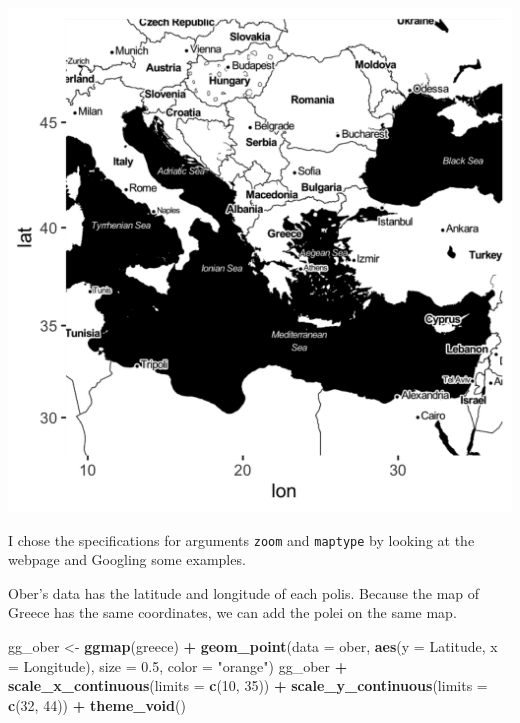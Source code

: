 \documentclass[
]{book}
\newenvironment{Shaded}{\begin{snugshade}}{\end{snugshade}}
\newcommand{\DataTypeTok}[1]{\textcolor[rgb]{0.13,0.29,0.53}{#1}}
\newcommand{\DecValTok}[1]{\textcolor[rgb]{0.00,0.00,0.81}{#1}}
\newcommand{\FloatTok}[1]{\textcolor[rgb]{0.00,0.00,0.81}{#1}}
\newcommand{\KeywordTok}[1]{\textcolor[rgb]{0.13,0.29,0.53}{\textbf{#1}}}
\newcommand{\NormalTok}[1]{#1}
\newcommand{\OperatorTok}[1]{\textcolor[rgb]{0.81,0.36,0.00}{\textbf{#1}}}
\newcommand{\StringTok}[1]{\textcolor[rgb]{0.31,0.60,0.02}{#1}}
\theoremstyle{definition}
\theoremstyle{definition}
\theoremstyle{definition}
\theoremstyle{remark}
\begin{document}
\includegraphics{images/ober_ggmap_default.png}

I chose the specifications for arguments \texttt{zoom} and \texttt{maptype} by looking at the webpage and Googling some examples.

Ober's data has the latitude and longitude of each polis. Because the map of Greece has the same coordinates, we can add the polei on the same map.

\begin{Shaded}
\begin{Highlighting}[]
\NormalTok{gg\_ober <{-}}\StringTok{ }\KeywordTok{ggmap}\NormalTok{(greece) }\OperatorTok{+}
\StringTok{  }\KeywordTok{geom\_point}\NormalTok{(}\DataTypeTok{data =}\NormalTok{ ober, }
             \KeywordTok{aes}\NormalTok{(}\DataTypeTok{y =}\NormalTok{ Latitude, }\DataTypeTok{x =}\NormalTok{ Longitude), }
             \DataTypeTok{size =} \FloatTok{0.5}\NormalTok{,}
             \DataTypeTok{color =} \StringTok{"orange"}\NormalTok{)}
\NormalTok{gg\_ober }\OperatorTok{+}\StringTok{ }
\StringTok{  }\KeywordTok{scale\_x\_continuous}\NormalTok{(}\DataTypeTok{limits =} \KeywordTok{c}\NormalTok{(}\DecValTok{10}\NormalTok{, }\DecValTok{35}\NormalTok{)) }\OperatorTok{+}\StringTok{ }
\StringTok{  }\KeywordTok{scale\_y\_continuous}\NormalTok{(}\DataTypeTok{limits =} \KeywordTok{c}\NormalTok{(}\DecValTok{32}\NormalTok{, }\DecValTok{44}\NormalTok{)) }\OperatorTok{+}
\StringTok{  }\KeywordTok{theme\_void}\NormalTok{()}
\end{Highlighting}
\end{Shaded}
\end{document}

